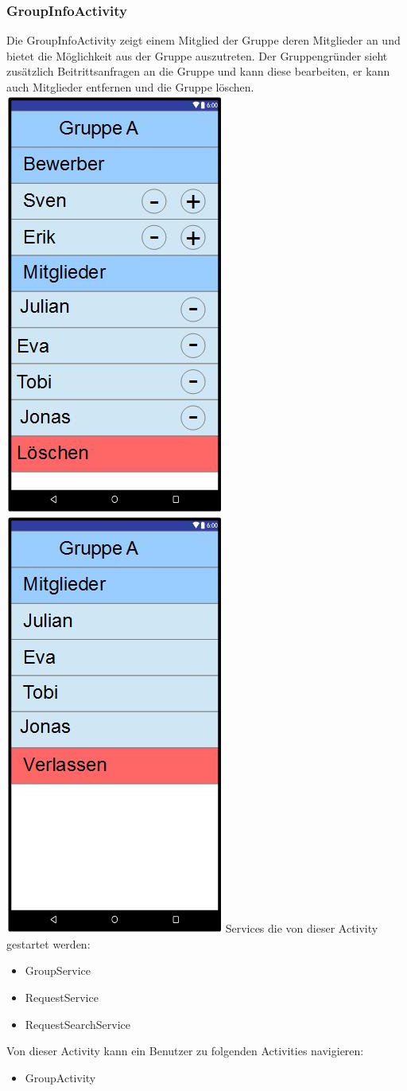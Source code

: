 	\subsubsection {GroupInfoActivity}
	Die GroupInfoActivity zeigt einem Mitglied der Gruppe deren Mitglieder an und bietet die Möglichkeit aus der Gruppe auszutreten. Der Gruppengründer sieht zusätzlich Beitrittsanfragen an die Gruppe und kann diese bearbeiten, er kann auch Mitglieder entfernen und die Gruppe löschen.
	\newline
	\includegraphics[width=.3\textwidth]{GUI_GruppeInfoGruender.jpg}
	\includegraphics[width=.3\textwidth]{GUI_GruppeInfoNormal.jpg}
	\newline
	Services die von dieser Activity gestartet werden:
	\begin{itemize}
	\item GroupService
	\item RequestService
	\item RequestSearchService
	\end{itemize}
	Von dieser Activity kann ein Benutzer zu folgenden Activities navigieren:
	\begin{itemize} 
	 \item GroupActivity
	 \end{itemize}
	 \newpage
